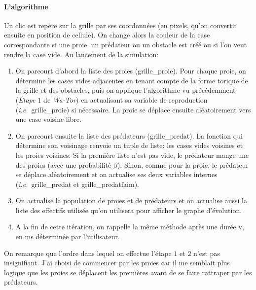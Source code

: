 \documentclass[11pt]{article}
\newcommand{\ie}{\textsl{i.e.}\ }
\begin{document}
\paragraph{L'algorithme}
Un clic est repère sur la grille par ses coordonnées (en pixels, qu'on convertit ensuite en position de cellule). On change alors la couleur de la case correspondante si une proie, un prédateur ou un obstacle est créé ou si l'on veut rendre la case vide. Au lancement de la simulation:
\begin{enumerate}
    \item On parcourt d'abord la liste des proies (\textsf{grille\_proie}). Pour chaque proie, on détermine les cases vides adjacentes en tenant compte de la forme torique de la grille et des obstacles, puis on applique l'algorithme vu précédemment (\emph{Étape $1$} de \emph{Wa-Tor}) en actualisant sa variable de reproduction (\ie \textsf{grille\_proie}) si nécessaire. La proie se déplace ensuite aléatoirement vers une case voisine libre.
    \item On parcourt ensuite la liste des prédateurs (\textsf{grille\_predat}). La fonction qui détermine son voisinage renvoie un tuple de liste: les cases vides voisines et les proies voisines. Si la première liste n'est pas vide, le prédateur mange une des proies (avec une probabilité $\beta$). Sinon, comme pour la proie, le prédateur se déplace aléatoirement et on actualise ses deux variables internes (\ie \textsf{grille\_predat} et \textsf{grille\_predatfaim}).
    \item On actualise la population de proies et de prédateurs et on actualise aussi la liste des effectifs utilisée qu'on utilisera pour afficher le graphe d'évolution.
    \item A la fin de cette itération, on rappelle la même méthode après une durée \textsf{v}, en $\si{\milli \second}$ déterminée par l'utilisateur.
\end{enumerate}
On remarque que l'ordre dans lequel on effectue l'étape $1$ et $2$ n'est pas insignifiant. J'ai choisi de commencer par les proies car il me semblait plus logique que les proies se déplacent les premières avant de se faire rattraper par les prédateurs.
\end{document}
